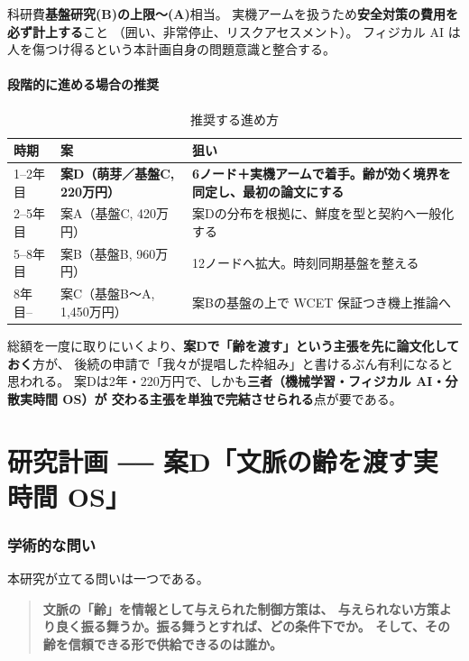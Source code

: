 \documentclass[11pt,a4paper]{article}
\newcommand{\prob}[1]{\textbf{\textcolor{red!55!black}{#1}}}
\newcommand{\keyp}[1]{\textbf{\textcolor{blue!45!black}{#1}}}
\begin{document}
\noindent
科研費\keyp{基盤研究(B)の上限〜(A)}相当。
実機アームを扱うため\prob{安全対策の費用を必ず計上する}こと
（囲い、非常停止、リスクアセスメント）。
フィジカル AI は人を傷つけ得るという本計画自身の問題意識と整合する。

\subsection{段階的に進める場合の推奨}

\begin{table}[htbp]
\centering
\small
\caption{推奨する進め方}
\begin{tabularx}{\textwidth}{@{}l l X@{}}
\toprule
\textbf{時期} & \textbf{案} & \textbf{狙い} \\
\midrule
1--2年目 & \textbf{案D（萌芽／基盤C, 220万円）} & \textbf{6ノード＋実機アームで着手。齢が効く境界を同定し、最初の論文にする} \\
2--5年目 & 案A（基盤C, 420万円） & 案Dの分布を根拠に、鮮度を型と契約へ一般化する \\
5--8年目 & 案B（基盤B, 960万円） & 12ノードへ拡大。時刻同期基盤を整える \\
8年目--   & 案C（基盤B〜A, 1,450万円） & 案Bの基盤の上で WCET 保証つき機上推論へ \\
\bottomrule
\end{tabularx}
\end{table}

\noindent
総額を一度に取りにいくより、\keyp{案Dで「齢を渡す」という主張を先に論文化しておく}方が、
後続の申請で「我々が提唱した枠組み」と書けるぶん有利になると思われる。
案Dは2年・220万円で、しかも\keyp{三者（機械学習・フィジカル AI・分散実時間 OS）が
交わる主張を単独で完結させられる}点が要である。


\part{研究計画 ── 案D「文脈の齢を渡す実時間 OS」}
\label{part:plan}

\section{学術的な問い}

本研究が立てる問いは一つである。

\begin{quote}
\keyp{文脈の「齢」を情報として与えられた制御方策は、
与えられない方策より良く振る舞うか。振る舞うとすれば、どの条件下でか。
そして、その齢を信頼できる形で供給できるのは誰か。}
\end{quote}
\end{document}
